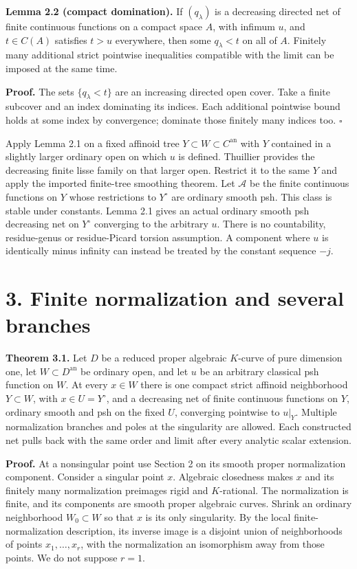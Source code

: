 \documentclass[
  11pt,
]{article}
\begin{document}
\textbf{Lemma 2.2 (compact domination).} If \((q_\lambda)\) is a
decreasing directed net of finite continuous functions on a compact
space \(A\), with infimum \(u\), and \(t\in C(A)\) satisfies \(t>u\)
everywhere, then some \(q_\lambda<t\) on all of \(A\). Finitely many
additional strict pointwise inequalities compatible with the limit can
be imposed at the same time.

\textbf{Proof.} The sets \(\{q_\lambda<t\}\) are an increasing directed
open cover. Take a finite subcover and an index dominating its indices.
Each additional pointwise bound holds at some index by convergence;
dominate those finitely many indices too. \(\square\)

Apply Lemma 2.1 on a fixed affinoid tree
\(Y\subset W\subset C^{\mathrm{an}}\) with \(Y\) contained in a slightly
larger ordinary open on which \(u\) is defined. Thuillier provides the
decreasing finite lisse family on that larger open. Restrict it to the
same \(Y\) and apply the imported finite-tree smoothing theorem. Let
\(\mathcal A\) be the finite continuous functions on \(Y\) whose
restrictions to \(Y^\circ\) are ordinary smooth psh. This class is
stable under constants. Lemma 2.1 gives an actual ordinary smooth psh
decreasing net on \(Y^\circ\) converging to the arbitrary \(u\). There
is no countability, residue-genus or residue-Picard torsion assumption.
A component where \(u\) is identically minus infinity can instead be
treated by the constant sequence \(-j\).

\section{3. Finite normalization and several
branches}\label{finite-normalization-and-several-branches}

\textbf{Theorem 3.1.} Let \(D\) be a reduced proper algebraic
\(K\)-curve of pure dimension one, let \(W\subset D^{\mathrm{an}}\) be
ordinary open, and let \(u\) be an arbitrary classical psh function on
\(W\). At every \(x\in W\) there is one compact strict affinoid
neighborhood \(Y\subset W\), with \(x\in U=Y^\circ\), and a decreasing
net of finite continuous functions on \(Y\), ordinary smooth and psh on
the fixed \(U\), converging pointwise to \(u|_Y\). Multiple
normalization branches and poles at the singularity are allowed. Each
constructed net pulls back with the same order and limit after every
analytic scalar extension.

\textbf{Proof.} At a nonsingular point use Section 2 on its smooth
proper normalization component. Consider a singular point \(x\).
Algebraic closedness makes \(x\) and its finitely many normalization
preimages rigid and \(K\)-rational. The normalization is finite, and its
components are smooth proper algebraic curves. Shrink an ordinary
neighborhood \(W_0\subset W\) so that \(x\) is its only singularity. By
the local finite-normalization description, its inverse image is a
disjoint union of neighborhoods of points \(x_1,\ldots,x_r\), with the
normalization an isomorphism away from those points. We do not suppose
\(r=1\).
\end{document}
